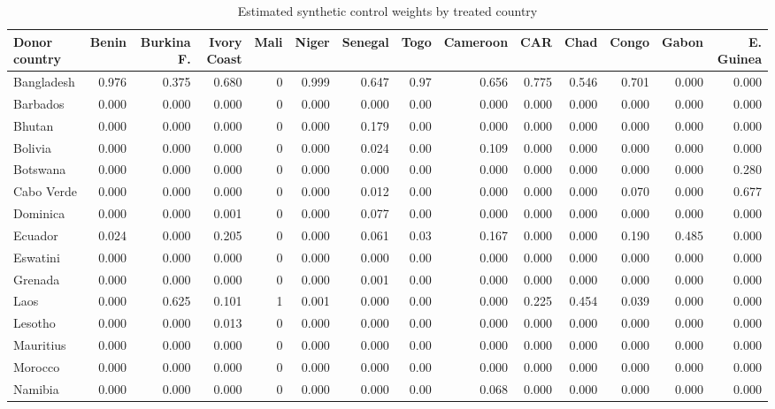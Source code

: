\begin{table}

\caption{Estimated synthetic control weights by treated country}
\centering
\begin{tabular}[t]{lrrrrrrrrrrrrr}
\toprule
Donor country & Benin & Burkina F. & Ivory Coast & Mali & Niger & Senegal & Togo & Cameroon & CAR & Chad & Congo & Gabon & E. Guinea\\
\midrule
Bangladesh & 0.976 & 0.375 & 0.680 & 0 & 0.999 & 0.647 & 0.97 & 0.656 & 0.775 & 0.546 & 0.701 & 0.000 & 0.000\\
Barbados & 0.000 & 0.000 & 0.000 & 0 & 0.000 & 0.000 & 0.00 & 0.000 & 0.000 & 0.000 & 0.000 & 0.000 & 0.000\\
Bhutan & 0.000 & 0.000 & 0.000 & 0 & 0.000 & 0.179 & 0.00 & 0.000 & 0.000 & 0.000 & 0.000 & 0.000 & 0.000\\
Bolivia & 0.000 & 0.000 & 0.000 & 0 & 0.000 & 0.024 & 0.00 & 0.109 & 0.000 & 0.000 & 0.000 & 0.000 & 0.000\\
Botswana & 0.000 & 0.000 & 0.000 & 0 & 0.000 & 0.000 & 0.00 & 0.000 & 0.000 & 0.000 & 0.000 & 0.000 & 0.280\\
\addlinespace
Cabo Verde & 0.000 & 0.000 & 0.000 & 0 & 0.000 & 0.012 & 0.00 & 0.000 & 0.000 & 0.000 & 0.070 & 0.000 & 0.677\\
Dominica & 0.000 & 0.000 & 0.001 & 0 & 0.000 & 0.077 & 0.00 & 0.000 & 0.000 & 0.000 & 0.000 & 0.000 & 0.000\\
Ecuador & 0.024 & 0.000 & 0.205 & 0 & 0.000 & 0.061 & 0.03 & 0.167 & 0.000 & 0.000 & 0.190 & 0.485 & 0.000\\
Eswatini & 0.000 & 0.000 & 0.000 & 0 & 0.000 & 0.000 & 0.00 & 0.000 & 0.000 & 0.000 & 0.000 & 0.000 & 0.000\\
Grenada & 0.000 & 0.000 & 0.000 & 0 & 0.000 & 0.001 & 0.00 & 0.000 & 0.000 & 0.000 & 0.000 & 0.000 & 0.000\\
\addlinespace
Laos & 0.000 & 0.625 & 0.101 & 1 & 0.001 & 0.000 & 0.00 & 0.000 & 0.225 & 0.454 & 0.039 & 0.000 & 0.000\\
Lesotho & 0.000 & 0.000 & 0.013 & 0 & 0.000 & 0.000 & 0.00 & 0.000 & 0.000 & 0.000 & 0.000 & 0.000 & 0.000\\
Mauritius & 0.000 & 0.000 & 0.000 & 0 & 0.000 & 0.000 & 0.00 & 0.000 & 0.000 & 0.000 & 0.000 & 0.000 & 0.000\\
Morocco & 0.000 & 0.000 & 0.000 & 0 & 0.000 & 0.000 & 0.00 & 0.000 & 0.000 & 0.000 & 0.000 & 0.000 & 0.000\\
Namibia & 0.000 & 0.000 & 0.000 & 0 & 0.000 & 0.000 & 0.00 & 0.068 & 0.000 & 0.000 & 0.000 & 0.000 & 0.000\\

\end{tabular}
\end{table}
